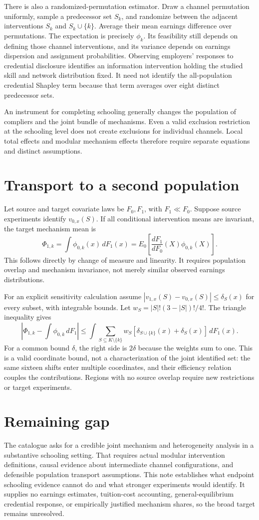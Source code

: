 \documentclass[11pt,a4paper]{article}
\begin{document}
There is also a randomized-permutation estimator. Draw a channel permutation uniformly, sample a predecessor set $S_k$, and randomize between the adjacent interventions $S_k$ and $S_k\cup\{k\}$. Average their mean earnings difference over permutations. The expectation is precisely $\phi_k$. Its feasibility still depends on defining those channel interventions, and its variance depends on earnings dispersion and assignment probabilities. Observing employers' responses to credential disclosure identifies an information intervention holding the studied skill and network distribution fixed. It need not identify the all-population credential Shapley term because that term averages over eight distinct predecessor sets.

An instrument for completing schooling generally changes the population of compliers and the joint bundle of mechanisms. Even a valid exclusion restriction at the schooling level does not create exclusions for individual channels. Local total effects and modular mechanism effects therefore require separate equations and distinct assumptions.

\section{Transport to a second population}
Let source and target covariate laws be $F_0,F_1$, with $F_1\ll F_0$. Suppose source experiments identify $v_{0,x}(S)$. If all conditional intervention means are invariant, the target mechanism mean is
\[
 \Phi_{1,k}=\int\phi_{0,k}(x)\,dF_1(x)
 =E_0\!\left[\frac{dF_1}{dF_0}(X)\phi_{0,k}(X)\right].
\]
This follows directly by change of measure and linearity. It requires population overlap and mechanism invariance, not merely similar observed earnings distributions.

For an explicit sensitivity calculation assume
$|v_{1,x}(S)-v_{0,x}(S)|\le\delta_S(x)$ for every subset, with integrable bounds. Let $w_S=|S|!(3-|S|)!/4!$. The triangle inequality gives
\[
 |\Phi_{1,k}-\int\phi_{0,k}\,dF_1|
 \le\int\sum_{S\subseteq K\setminus\{k\}}w_S
       [\delta_{S\cup\{k\}}(x)+\delta_S(x)]\,dF_1(x).
\]
For a common bound $\delta$, the right side is $2\delta$ because the weights sum to one. This is a valid coordinate bound, not a characterization of the joint identified set: the same sixteen shifts enter multiple coordinates, and their efficiency relation couples the contributions. Regions with no source overlap require new restrictions or target experiments.

\section{Remaining gap}
The catalogue asks for a credible joint mechanism and heterogeneity analysis in a substantive schooling setting. That requires actual modular intervention definitions, causal evidence about intermediate channel configurations, and defensible population transport assumptions. This note establishes what endpoint schooling evidence cannot do and what stronger experiments would identify. It supplies no earnings estimates, tuition-cost accounting, general-equilibrium credential response, or empirically justified mechanism shares, so the broad target remains unresolved.
\end{document}

